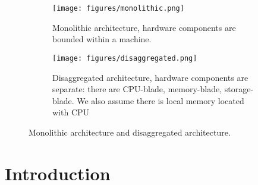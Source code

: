 \documentclass[twocolumn]{article}
\begin{document}
\begin{figure*}[h!]
     \centering
     \captionsetup[subfigure]{position=b}
     \begin{subfigure}[b]{0.28\textwidth}
         \texttt{[image: figures/monolithic.png]}
         \caption{Monolithic architecture, hardware components are bounded within a machine.}
         \label{fig:monolithic architecture}
     \end{subfigure}
     \hfill
     \begin{subfigure}[b]{0.68\textwidth}
         \texttt{[image: figures/disaggregated.png]}
         \caption{Disaggregated architecture, hardware components are separate: there are CPU-blade, memory-blade, storage-blade. We also assume there is local memory located with CPU}
         \label{fig:disaggregated architecture}
     \end{subfigure}
     \caption{Monolithic architecture and disaggregated architecture.}
     \label{fig:architecture}
\end{figure*}

\section{Introduction}
\end{document}

